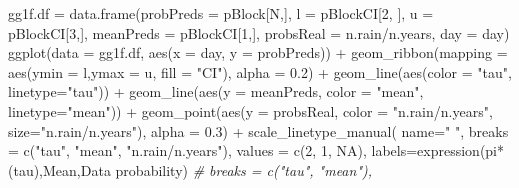 \documentclass[
]{article}
\newenvironment{Shaded}{\begin{snugshade}}{\end{snugshade}}
\newcommand{\AttributeTok}[1]{\textcolor[rgb]{0.77,0.63,0.00}{#1}}
\newcommand{\CommentTok}[1]{\textcolor[rgb]{0.56,0.35,0.01}{\textit{#1}}}
\newcommand{\ConstantTok}[1]{\textcolor[rgb]{0.00,0.00,0.00}{#1}}
\newcommand{\DecValTok}[1]{\textcolor[rgb]{0.00,0.00,0.81}{#1}}
\newcommand{\FloatTok}[1]{\textcolor[rgb]{0.00,0.00,0.81}{#1}}
\newcommand{\FunctionTok}[1]{\textcolor[rgb]{0.00,0.00,0.00}{#1}}
\newcommand{\NormalTok}[1]{#1}
\newcommand{\OtherTok}[1]{\textcolor[rgb]{0.56,0.35,0.01}{#1}}
\newcommand{\SpecialCharTok}[1]{\textcolor[rgb]{0.00,0.00,0.00}{#1}}
\newcommand{\StringTok}[1]{\textcolor[rgb]{0.31,0.60,0.02}{#1}}
\begin{document}
\begin{Shaded}
\begin{Highlighting}[]
\NormalTok{gg1f.df }\OtherTok{=} \FunctionTok{data.frame}\NormalTok{(}\AttributeTok{probPreds =}\NormalTok{ pBlock[N,], }\AttributeTok{l =}\NormalTok{ pBlockCI[}\DecValTok{2}\NormalTok{, ], }
                     \AttributeTok{u =}\NormalTok{ pBlockCI[}\DecValTok{3}\NormalTok{,], }\AttributeTok{meanPreds =}\NormalTok{ pBlockCI[}\DecValTok{1}\NormalTok{,], }
                     \AttributeTok{probsReal =}\NormalTok{ n.rain}\SpecialCharTok{/}\NormalTok{n.years, }
                     \AttributeTok{day =}\NormalTok{ day)}
\FunctionTok{ggplot}\NormalTok{(}\AttributeTok{data =}\NormalTok{ gg1f.df, }\FunctionTok{aes}\NormalTok{(}\AttributeTok{x =}\NormalTok{ day, }\AttributeTok{y =}\NormalTok{ probPreds)) }\SpecialCharTok{+} 
  \FunctionTok{geom\_ribbon}\NormalTok{(}\AttributeTok{mapping =} \FunctionTok{aes}\NormalTok{(}\AttributeTok{ymin =}\NormalTok{ l,}\AttributeTok{ymax =}\NormalTok{ u, }\AttributeTok{fill =} \StringTok{"CI"}\NormalTok{), }\AttributeTok{alpha =} \FloatTok{0.2}\NormalTok{) }\SpecialCharTok{+}
  \FunctionTok{geom\_line}\NormalTok{(}\FunctionTok{aes}\NormalTok{(}\AttributeTok{color =} \StringTok{"tau"}\NormalTok{, }\AttributeTok{linetype=}\StringTok{"tau"}\NormalTok{)) }\SpecialCharTok{+}
  \FunctionTok{geom\_line}\NormalTok{(}\FunctionTok{aes}\NormalTok{(}\AttributeTok{y =}\NormalTok{ meanPreds, }\AttributeTok{color =} \StringTok{"mean"}\NormalTok{, }\AttributeTok{linetype=}\StringTok{"mean"}\NormalTok{)) }\SpecialCharTok{+}
  \FunctionTok{geom\_point}\NormalTok{(}\FunctionTok{aes}\NormalTok{(}\AttributeTok{y =}\NormalTok{ probsReal, }\AttributeTok{color =} \StringTok{"n.rain/n.years"}\NormalTok{,}
                \AttributeTok{size=}\StringTok{"n.rain/n.years"}\NormalTok{), }\AttributeTok{alpha =} \FloatTok{0.3}\NormalTok{) }\SpecialCharTok{+} 
  \FunctionTok{scale\_linetype\_manual}\NormalTok{(}
    \AttributeTok{name=}\StringTok{" "}\NormalTok{,}
    \AttributeTok{breaks =} \FunctionTok{c}\NormalTok{(}\StringTok{"tau"}\NormalTok{, }\StringTok{"mean"}\NormalTok{, }\StringTok{"n.rain/n.years"}\NormalTok{),}
    \AttributeTok{values =} \FunctionTok{c}\NormalTok{(}\DecValTok{2}\NormalTok{, }\DecValTok{1}\NormalTok{, }\ConstantTok{NA}\NormalTok{),}
    \AttributeTok{labels=}\FunctionTok{expression}\NormalTok{(pi}\SpecialCharTok{*}\NormalTok{(tau),}\StringTok{\textquotesingle{}Mean\textquotesingle{}}\NormalTok{,}\StringTok{\textquotesingle{}Data probability\textquotesingle{}}\NormalTok{)}
    \CommentTok{\# breaks = c("tau", "mean"),}

\end{Highlighting}
\end{Shaded}
\end{document}
